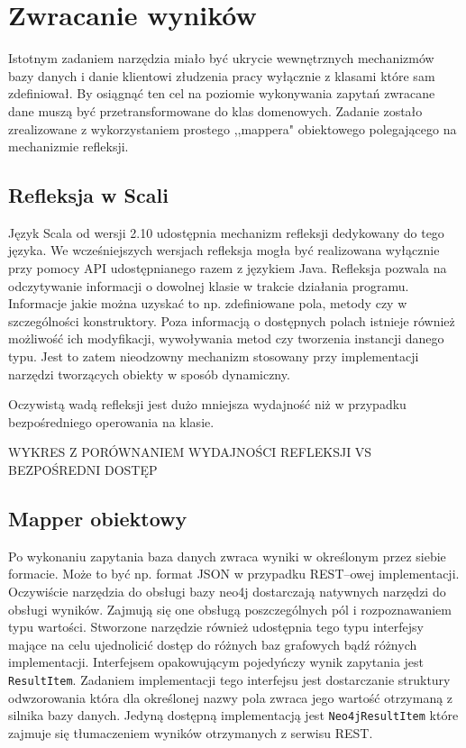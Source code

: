\documentclass[brudnopis]{xmgr}
\begin{document}
\section{Zwracanie wyników}

Istotnym zadaniem narzędzia miało być ukrycie wewnętrznych mechanizmów bazy danych i danie klientowi złudzenia pracy wyłącznie z klasami które sam zdefiniował. By osiągnąć ten cel na poziomie wykonywania zapytań zwracane dane muszą być przetransformowane do klas domenowych. Zadanie zostało zrealizowane z wykorzystaniem prostego ,,mappera" obiektowego polegającego na mechanizmie refleksji.

\subsection{Refleksja w Scali}

Język Scala od wersji 2.10 udostępnia mechanizm refleksji dedykowany do tego języka. We wcześniejszych wersjach refleksja mogła być realizowana wyłącznie przy pomocy API udostępnianego razem z językiem Java. Refleksja pozwala na odczytywanie informacji o dowolnej klasie w trakcie działania programu. Informacje jakie można uzyskać to np. zdefiniowane pola, metody czy w szczególności konstruktory. Poza informacją o dostępnych polach istnieje również możliwość ich modyfikacji, wywoływania metod czy tworzenia instancji danego typu. Jest to zatem nieodzowny mechanizm stosowany przy implementacji narzędzi tworzących obiekty w sposób dynamiczny.

Oczywistą wadą refleksji jest dużo mniejsza wydajność niż w przypadku bezpośredniego operowania na klasie.

WYKRES Z PORÓWNANIEM WYDAJNOŚCI REFLEKSJI VS BEZPOŚREDNI DOSTĘP

\subsection{Mapper obiektowy}

Po wykonaniu zapytania baza danych zwraca wyniki w określonym przez siebie formacie. Może to być np. format JSON w przypadku REST--owej implementacji. Oczywiście narzędzia do obsługi bazy neo4j dostarczają natywnych narzędzi do obsługi wyników. Zajmują się one obsługą poszczególnych pól i rozpoznawaniem typu wartości. Stworzone narzędzie również udostępnia tego typu interfejsy mające na celu ujednolicić dostęp do różnych baz grafowych bądź różnych implementacji. Interfejsem opakowującym pojedyńczy wynik zapytania jest \texttt{ResultItem}. Zadaniem implementacji tego interfejsu jest dostarczanie struktury odwzorowania która dla określonej nazwy pola zwraca jego wartość otrzymaną z silnika bazy danych. Jedyną dostępną implementacją jest \texttt{Neo4jResultItem} które zajmuje się tłumaczeniem wyników otrzymanych z serwisu REST.
\end{document}
